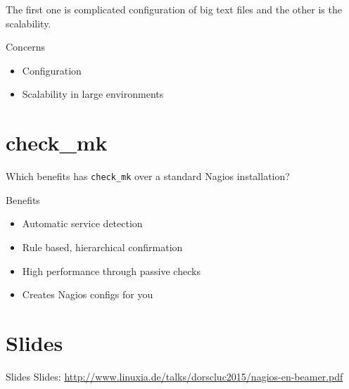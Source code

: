 The first one is complicated configuration of big text files
and the other is the scalability.

\begin{frame}{Concerns}

\begin{itemize}
\item Configuration
\item Scalability in large environments
\end{itemize}
\end{frame}

\section{check\_mk}

Which benefits has \verb|check_mk| over a standard Nagios installation?

\begin{frame}[fragile]{Benefits}
\begin{itemize}
\item Automatic service detection
\item Rule based, hierarchical confirmation
\item High performance through passive checks
\item Creates Nagios configs for you
\end{itemize}
\end{frame}

\section{Slides}

\begin{frame}{Slides}
Slides:
\url{http://www.linuxia.de/talks/dorscluc2015/nagios-en-beamer.pdf}
\end{frame}



